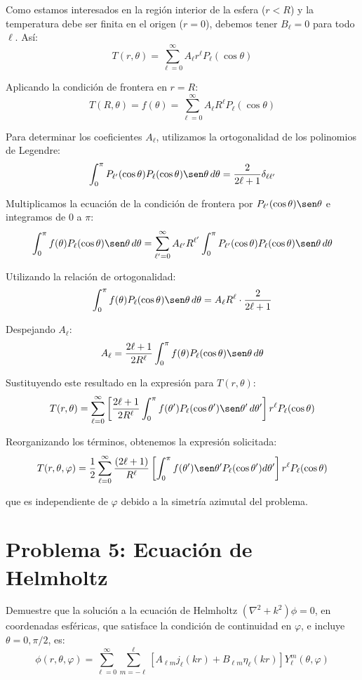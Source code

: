 \documentclass[a4paper]{article}
\begin{document}
Como estamos interesados en la región interior de la esfera ($r < R$) y la temperatura debe ser finita en el origen ($r=0$), debemos tener $B_\ell = 0$ para todo $\ell$. Así:
$$
T(r,\theta) = \sum_{\ell=0}^{\infty} A_\ell r^\ell P_\ell(\cos\theta)
$$

Aplicando la condición de frontera en $r = R$:
$$
T(R,\theta) = f(\theta) = \sum_{\ell=0}^{\infty} A_\ell R^\ell P_\ell(\cos\theta)
$$

Para determinar los coeficientes $A_\ell$, utilizamos la ortogonalidad de los polinomios de Legendre:
$$
\int_0^{\pi} P_{\ell'}(\cos\theta) P_\ell(\cos\theta) \sen\theta \, d\theta = \frac{2}{2\ell+1} \delta_{\ell\ell'}
$$

Multiplicamos la ecuación de la condición de frontera por $P_{\ell'}(\cos\theta) \sen\theta$ e integramos de $0$ a $\pi$:
$$
\int_0^{\pi} f(\theta) P_\ell(\cos\theta) \sen\theta \, d\theta = \sum_{\ell'=0}^{\infty} A_{\ell'} R^{\ell'} \int_0^{\pi} P_{\ell'}(\cos\theta) P_\ell(\cos\theta) \sen\theta \, d\theta
$$

Utilizando la relación de ortogonalidad:
$$
\int_0^{\pi} f(\theta) P_\ell(\cos\theta) \sen\theta \, d\theta = A_\ell R^\ell \cdot \frac{2}{2\ell+1}
$$

Despejando $A_\ell$:
$$
A_\ell = \frac{2\ell+1}{2R^\ell} \int_0^{\pi} f(\theta) P_\ell(\cos\theta) \sen\theta \, d\theta
$$

Sustituyendo este resultado en la expresión para $T(r,\theta)$:
$$
T(r,\theta) = \sum_{\ell=0}^{\infty} \left[ \frac{2\ell+1}{2R^\ell} \int_0^{\pi} f(\theta') P_\ell(\cos\theta') \sen\theta' \, d\theta' \right] r^\ell P_\ell(\cos\theta)
$$

Reorganizando los términos, obtenemos la expresión solicitada:
$$
T(r,\theta,\varphi) = \frac{1}{2} \sum_{\ell=0}^{\infty} \frac{(2\ell+1)}{R^\ell} \left[ \int_0^{\pi} f(\theta') \sen\theta' P_\ell(\cos\theta') d\theta' \right] r^\ell P_\ell(\cos\theta)
$$

que es independiente de $\varphi$ debido a la simetría azimutal del problema.

\section{Problema 5: Ecuación de Helmholtz}
Demuestre que la solución a la ecuación de Helmholtz $(\nabla^2 + k^2)\phi = 0$, en coordenadas esféricas, que satisface la condición de continuidad en $\varphi$, e incluye $\theta = 0, \pi/2$, es:
$$\phi(r, \theta, \varphi) = \sum_{\ell=0}^{\infty} \sum_{m=-\ell}^{\ell} [A_{\ell m} j_\ell(kr) + B_{\ell m} \eta_\ell(kr)] Y_\ell^m(\theta, \varphi)$$
\end{document}
